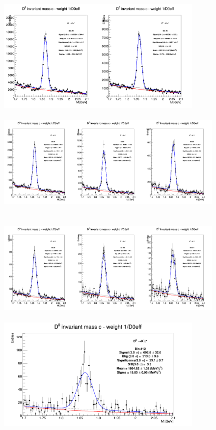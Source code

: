 \begin{figure}[!htp]
\centering

{\includegraphics[width=1\linewidth, height=5.6cm]{figuresVsCent/Dzero/MassPlots/2060/InvMassDistributions_Dzero_Bins4to5.png}}
{\includegraphics[width=1\linewidth, height=5.6cm]{figuresVsCent/Dzero/MassPlots/2060/InvMassDistributions_Dzero_Bins6to8.png}}
{\includegraphics[width=1\linewidth, height=5.6cm]{figuresVsCent/Dzero/MassPlots/2060/InvMassDistributions_Dzero_Bins9to11.png}}
{\includegraphics[width=0.6\linewidth, height=5.6cm]{figuresVsCent/Dzero/MassPlots/2060/InvMassDistributions_Dzero_Bins12to12.png}}


\end{figure}
